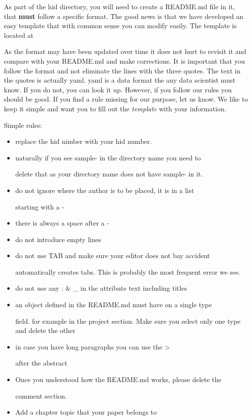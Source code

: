 As part of the hid directory, you will need to create a README.md file
in it, that \textbf{must} follow a specific format. The good news is
that we have developed an easy template that with common sense you can
modify easily. The template is located at


As the format may have been updated over time it does not hurt to
revisit it and compare with your README.md and make corrections. It is
important that you follow the format and not eliminate the lines with
the three quotes. The text in the quotes is actually yaml. yaml is a
data format the any data scientist must know. If you do not, you can
look it up. However, if you follow our rules you should be good. If you
find a rule missing for our purpose, let us know. We like to keep it
simple and want you to fill out the \emph{template} with your
information.

Simple rules:

\begin{itemize}

\item
  replace the hid nimber with your hid number.
\item naturally if you see sample- in the directory name you need to

  delete that as your directory name does not have sample- in it.
\item do not ignore where the author is to be placed, it is in a list

  starting with a -
\item there is always a space after a -

\item do not introduce empty lines

\item do not use TAB and make sure your editor does not bay accident

  automatically creates tabs. This is probably the most frequent error
  we see.
\item do not use any : \& \_ in the attribute text including titles

\item an object defined in the README.md must have on a single type

  field.  for example in the project section. Make sure you select
  only one type and delete the other
\item in case you have long paragraphs you can use the \textgreater{}

  after the abstract
\item Once you understood how the README.md works, please delete the

  comment section.
\item Add a chapter topic that your paper belongs to

\end{itemize}

